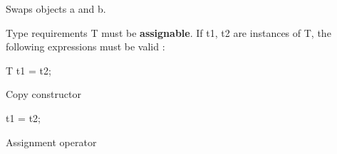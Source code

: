 Swaps objects {\ttfamily a} and {\ttfamily b}. 

\begin{DoxyParagraph}{Type requirements}
{\ttfamily T} must be {\bfseries assignable}. If {\ttfamily t1}, {\ttfamily t2} are instances of {\ttfamily T}, the following expressions must be valid \+:
\begin{DoxyItemize}
\item 
\begin{DoxyCode}
T t1 = t2; 
\end{DoxyCode}
 Copy constructor
\item 
\begin{DoxyCode}
t1 = t2; 
\end{DoxyCode}
 Assignment operator 
\end{DoxyItemize}
\end{DoxyParagraph}
